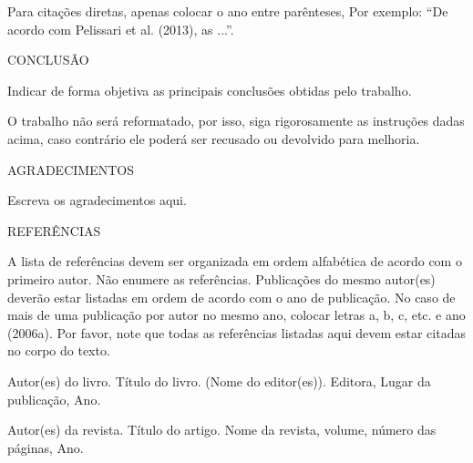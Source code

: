 \documentclass[
]{article}
\begin{document}
Para citações diretas, apenas colocar o ano entre parênteses, Por
exemplo: ``De acordo com Pelissari et al. (2013), as ...''.

CONCLUSÃO

Indicar de forma objetiva as principais conclusões obtidas pelo
trabalho.

O trabalho não será reformatado, por isso, siga rigorosamente as
instruções dadas acima, caso contrário ele poderá ser recusado ou
devolvido para melhoria.

AGRADECIMENTOS

Escreva os agradecimentos aqui.

REFERÊNCIAS

A lista de referências devem ser organizada em ordem alfabética de
acordo com o primeiro autor. Não enumere as referências. Publicações do
mesmo autor(es) deverão estar listadas em ordem de acordo com o ano de
publicação. No caso de mais de uma publicação por autor no mesmo ano,
colocar letras a, b, c, etc. e ano (2006a). Por favor, note que todas as
referências listadas aqui devem estar citadas no corpo do texto.

Autor(es) do livro. Título do livro. (Nome do editor(es)). Editora,
Lugar da publicação, Ano.

Autor(es) da revista. Título do artigo. Nome da revista, volume, número
das páginas, Ano.
\end{document}
